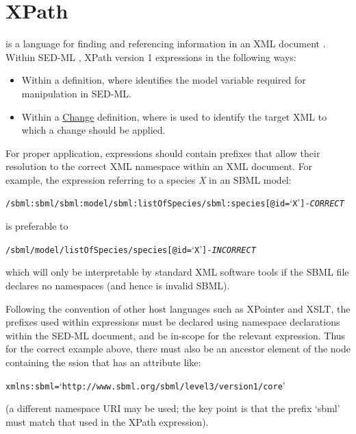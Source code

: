 \section{XPath}  
\label{sec:xpath}
 is a language for finding and referencing information in an XML document \citep{xpath:1999}. Within SED-ML \currentLV, XPath version 1 expressions  in the following ways:

\begin{itemize}
	\item {Within a \Variable definition, where  identifies the model variable required for manipulation in SED-ML.  }
	\item {Within a \hyperref[class:change]{Change} definition, where  is used to identify the target XML to which a change should be applied.  }
\end{itemize}

For proper application,  expressions should contain prefixes that allow their resolution to the correct XML namespace within an XML document. For example, the  expression referring to a species \emph{X} in an SBML model:
\begin{alltt}
/sbml:sbml/sbml:model/sbml:listOfSpecies/sbml:species[@id=`X'] {\tickYes -\emph{CORRECT}}
\end{alltt}
is preferable to 
\begin{alltt}
/sbml/model/listOfSpecies/species[@id=`X'] {\tickNo -\emph{INCORRECT} }
\end{alltt}

which will only be interpretable by standard XML software tools if the SBML file declares no namespaces (and hence is invalid SBML).

Following the convention of other  host languages such as XPointer and XSLT, the prefixes used within  expressions must be declared using namespace declarations within the SED-ML document, and be in-scope for the relevant expression. Thus for the correct example above, there must also be an ancestor element of the node containing the 
ssion that has an attribute like:
\begin{alltt}
xmlns:sbml=`http://www.sbml.org/sbml/level3/version1/core'
\end{alltt}
(a different namespace URI may be used; the key point is that the prefix `sbml' must match that used in the XPath expression).


